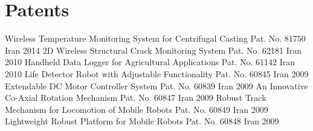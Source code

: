 \section{Patents}
\begin{cvhonors}
  \cvhonor
    {Wireless Temperature Monitoring System for Centrifugal Casting}
    {Pat. No. 81750}
    {Iran}
    {2014}
  \cvhonor
    {2D Wireless Structural Crack Monitoring System}
    {Pat. No. 62181}
    {Iran}
    {2010}
  \cvhonor
    {Handheld Data Logger for Agricultural Applications}
    {Pat. No. 61142}
    {Iran}
    {2010}
  \cvhonor
    {Life Detector Robot with Adjustable Functionality}
    {Pat. No. 60845}
    {Iran}
    {2009}
  \cvhonor
    {Extendable DC Motor Controller System}
    {Pat. No. 60839}
    {Iran}
    {2009}
  \cvhonor
    {An Innovative Co-Axial Rotation Mechanism}
    {Pat. No. 60847}
    {Iran}
    {2009}
  \cvhonor
    {Robust Track Mechanism for Locomotion of Mobile Robots}
    {Pat. No. 60849}
    {Iran}
    {2009}
  \cvhonor
    {Lightweight Robust Platform for Mobile Robots}
    {Pat. No. 60848}
    {Iran}
    {2009}
\end{cvhonors} 